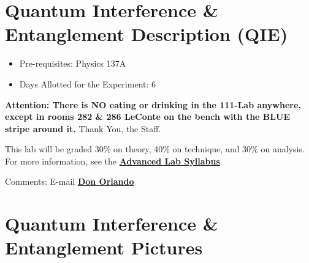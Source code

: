 \documentclass{../lab}
\begin{document}
\maketitle

\tableofcontents

\section{Quantum Interference \& Entanglement Description (QIE)}

\begin{itemize}
    \item Pre-requisites: Physics 137A

    \item Days Allotted for the Experiment: 6

\end{itemize}

\textbf{Attention: There is NO eating or drinking in the 111-Lab anywhere, except in rooms 282 \& 286 LeConte on the bench with the BLUE stripe around it.} Thank You, the Staff.

This lab will be graded 30\% on theory, 40\% on technique, and 30\% on analysis. For more information, see the \href{http://advancedlab.berkeley.edu/mediawiki/index.php/Advanced\_Syllabus}{\textbf{Advanced Lab Syllabus}}.

Comments: E-mail \href{\MailDonOrlando}{\textbf{Don Orlando}}

\section{Quantum Interference \& Entanglement Pictures}
\end{document}
